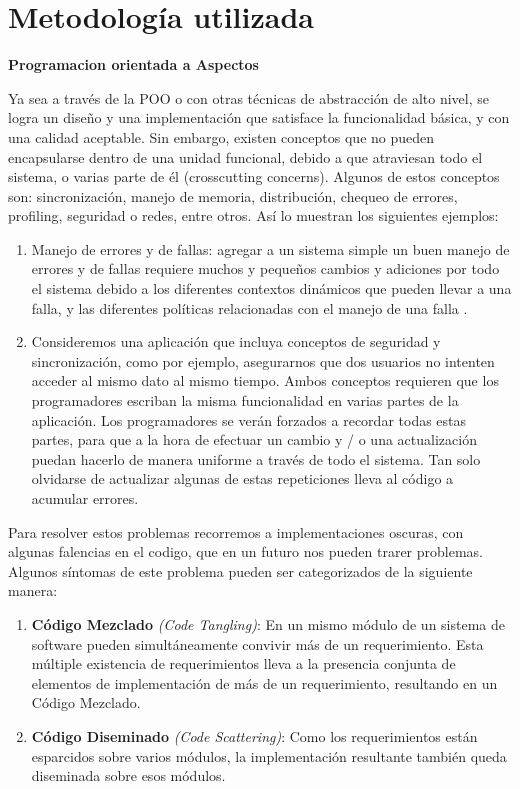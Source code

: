 \section{Metodología utilizada}
\label{sec:Methodology}

{\bf Programacion orientada a Aspectos }
		
Ya sea a través de la POO o con otras técnicas de abstracción de alto nivel, se
logra un diseño y una implementación que satisface la funcionalidad básica, y con
una calidad aceptable. Sin embargo, existen conceptos que no pueden encapsularse
dentro de una unidad funcional, debido a que atraviesan todo el sistema, o varias
parte de él (crosscutting concerns). Algunos de estos conceptos son: sincronización,
manejo de memoria, distribución, chequeo de errores, profiling, seguridad o redes,
entre otros. Así lo muestran los siguientes ejemplos:

\begin {enumerate}

	\item
	Manejo de errores y de fallas: agregar a un sistema simple un buen
	manejo de errores y de fallas requiere muchos y pequeños cambios y
	adiciones por todo el sistema debido a los diferentes contextos
	dinámicos que pueden llevar a una falla, y las diferentes políticas
	relacionadas con el manejo de una falla \cite{Kicz97a}.
	
	\item
	Consideremos una aplicación que incluya conceptos de seguridad y
	sincronización, como por ejemplo, asegurarnos que dos usuarios no
	intenten acceder al mismo dato al mismo tiempo. Ambos conceptos
	requieren que los programadores escriban la misma funcionalidad en
	varias partes de la aplicación. Los programadores se verán forzados a
	recordar todas estas partes, para que a la hora de efectuar un cambio
	y / o una actualización puedan hacerlo de manera uniforme a través
	de todo el sistema. Tan solo olvidarse de actualizar algunas de estas
	repeticiones lleva al código a acumular errores. \cite{Aquila}

\end{enumerate}

Para resolver estos problemas  recorremos a implementaciones oscuras, con
algunas falencias en el codigo, que en un futuro nos pueden trarer problemas.
Algunos síntomas de este problema pueden ser categorizados de la siguiente manera:

\begin {enumerate}

	\item {\bf Código Mezclado } \emph{(Code Tangling)}:
	En un mismo módulo de un sistema de software pueden simultáneamente convivir más
	de un requerimiento. Esta múltiple existencia de requerimientos lleva a la
	presencia conjunta de elementos de implementación de más de un
	requerimiento, resultando en un Código Mezclado.
	
	\item {\bf Código Diseminado} \emph{(Code Scattering)}:
	Como los requerimientos están esparcidos sobre varios módulos, la implementación
	resultante también queda diseminada sobre esos módulos.
 
\end{enumerate}


